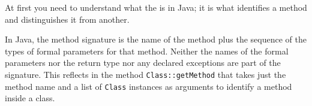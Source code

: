 At first you need to understand what the  is in Java; it is what identifies a method and distinguishes it from another.

In Java, the method signature is the name of the method plus the sequence of the types of formal parameters for that method. Neither the names of the formal parameters nor the return type nor any declared exceptions are part of the signature. This reflects in the method \lstinline|Class::getMethod|\autocite{ORACLE_DOC_CLASS:getMethod,ORACLE_DOC_CLASS:getDeclaredMethod} that takes just the method name and a list of \lstinline|Class| instances as arguments to identify a method inside a class.

